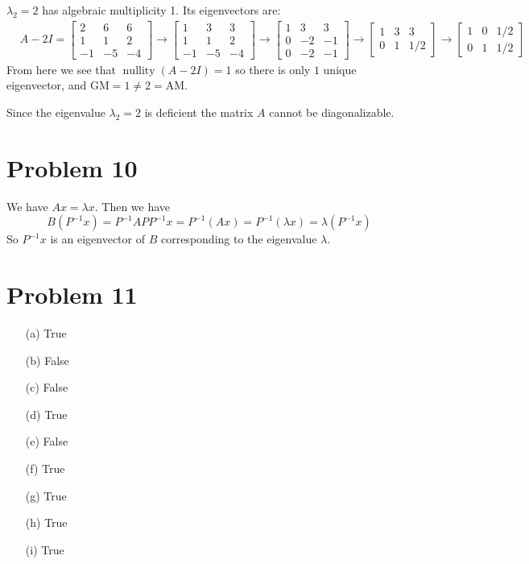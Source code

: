 \documentclass{article}
\newcommand*{\problem}[1]{\section*{Problem #1}}
\DeclareMathOperator{\nullity}{nullity}
\begin{document}
$\lambda_2=2$ has algebraic multiplicity 1. Its eigenvectors are:
\begin{align*}
	&A-2I
	= \begin{bmatrix}
		2 & 6 & 6 \\
		1 & 1 & 2 \\ 
		-1 & -5 & -4
	\end{bmatrix}
	\rightarrow \begin{bmatrix}
		1 & 3 & 3 \\
		1 & 1 & 2 \\
		-1 & -5 & -4
	\end{bmatrix}
	\rightarrow \begin{bmatrix}
		1 & 3 & 3 \\
		0 & -2 & -1 \\
		0 & -2 & -1
	\end{bmatrix}
	\rightarrow \begin{bmatrix}
		1 & 3 & 3 \\
		0 & 1 & 1/2
	\end{bmatrix}
	\rightarrow \begin{bmatrix}
		1 & 0 & 1/2 \\
		0 & 1 & 1/2
	\end{bmatrix}
\end{align*}
From here we see that $\nullity (A-2I)=1$ so there is only $1$ unique eigenvector, and $\mathrm{GM}=1\neq2=\mathrm{AM}$.

Since the eigenvalue $\lambda_2=2$ is deficient the matrix $A$ cannot be diagonalizable.

\problem{10}
We have $Ax=\lambda x$. Then we have
\begin{equation*}
	B \left(P^{-1}x\right)
	=P^{-1}APP^{-1}x
	=P^{-1}(Ax)
	=P^{-1}(\lambda x)
	=\lambda \left(P^{-1}x\right)
\end{equation*}
So $P^{-1}x$ is an eigenvector of $B$ corresponding to the eigenvalue $\lambda$.

\problem{11}
\begin{multicols}{5}
	\begin{itemize}
		\item[(a)] True
		\item[(b)] False
		\item[(c)] False
		\item[(d)] True
		\item[(e)] False
		\item[(f)] True
		\item[(g)] True
		\item[(h)] True
		\item[(i)] True
	\end{itemize}
\end{multicols}
\end{document}
